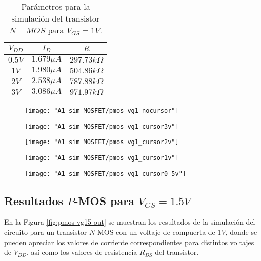 \documentclass[9pt,technote]{IEEEtran}
\begin{document}
	\begin{table}[H]
		\centering
		\begin{tabular}{|c|c|c|}
			\hline
			$V_{DD}$ & $I_{D}$ & $R$\\
			\hline
			$0.5V$ & $1.679 \mu A$ & $297.73 k\Omega$\\ 
			$1V$ & $1.980 \mu A$ &  $504.86 k\Omega$\\ 
			$2V$ & $2.538 \mu A$ &  $787.88 k\Omega$\\
			$3V$ & $3.086 \mu A$ &  $971.97 k\Omega$\\
			\hline
		\end{tabular}
		\caption{Parámetros para la simulación del transistor $N-MOS$ para $V_{GS}=1V$.}
		\label{Tabla:res_VG1_pmos:1}
	\end{table}
	
	\begin{figure}[H]
		\centering
		\texttt{[image: "A1 sim MOSFET/pmos vg1\_nocursor"]}
		\caption{}
		\label{fig:pmos-vg1nocursor}
	\end{figure}
	
	\begin{figure}[H]
		\centering
		\texttt{[image: "A1 sim MOSFET/pmos vg1\_cursor3v"]}
		\caption{}
		\label{fig:pmos-vg1cursor3v}
	\end{figure}
	
	\begin{figure}[H]
		\centering
		\texttt{[image: "A1 sim MOSFET/pmos vg1\_cursor2v"]}
		\caption{}
		\label{fig:pmos-vg1cursor2v}
	\end{figure}
	
	\begin{figure}[H]
		\centering
		\texttt{[image: "A1 sim MOSFET/pmos vg1\_cursor1v"]}
		\caption{}
		\label{fig:pmos-vg1cursor1v}
	\end{figure}
	
	\begin{figure}[H]
		\centering
		\texttt{[image: "A1 sim MOSFET/pmos vg1\_cursor0\_5v"]}
		\caption{}
		\label{fig:pmos-vg1cursor05v}
	\end{figure}
	
	\subsection*{Resultados $P$-MOS para $V_{GS}=1.5V$}

	En la Figura \ref{fig:pmos-vg15-out} se muestran los resultados de la simulación del circuito para un transistor $N$-MOS con un voltaje de compuerta de $1V$, donde se pueden apreciar los valores de corriente correspondientes para distintos voltajes de $V_{DD}$, así como los valores de resistencia $R_{DS}$ del transistor.
\end{document}
